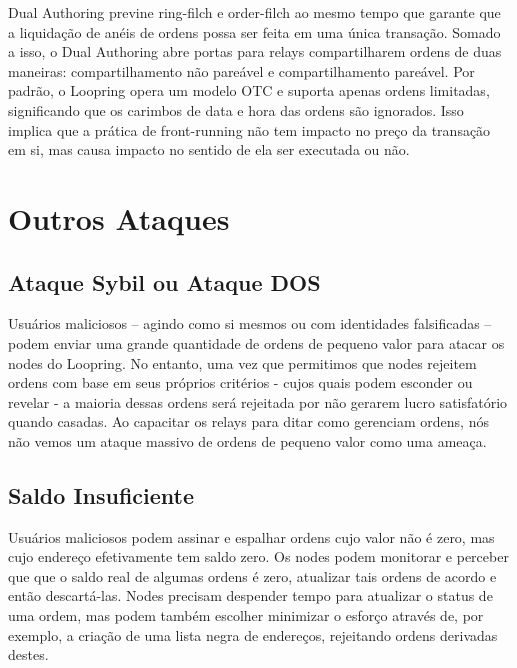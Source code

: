 \documentclass[UTF8,nofonts]{article}
\begin{document}
\begin{multicols}{2}
Dual Authoring previne ring-filch e order-filch ao mesmo tempo que garante que a liquidação de anéis de ordens possa ser feita em uma única transação. Somado a isso, o Dual Authoring abre portas para relays compartilharem ordens de duas maneiras: compartilhamento não pareável e compartilhamento pareável. Por padrão, o Loopring opera um modelo OTC e suporta apenas ordens limitadas, significando que os carimbos de data e hora das ordens são ignorados. Isso implica que a prática de front-running não tem impacto no preço da transação em si, mas causa impacto no sentido de ela ser executada ou não.

\section{Outros Ataques}

\subsection{Ataque Sybil ou Ataque DOS}
Usuários maliciosos – agindo como si mesmos ou com identidades falsificadas – podem enviar uma grande quantidade de ordens de pequeno valor para atacar os nodes do Loopring. No entanto, uma vez que permitimos que nodes rejeitem ordens com base em seus próprios critérios - cujos quais podem esconder ou revelar - a maioria dessas ordens será rejeitada por não gerarem lucro satisfatório quando casadas. Ao capacitar os relays para ditar como gerenciam ordens, nós não vemos um ataque massivo de ordens de pequeno valor como uma ameaça.

\subsection{Saldo Insuficiente}
Usuários maliciosos podem assinar e espalhar ordens cujo valor não é zero, mas cujo endereço efetivamente tem saldo zero. Os nodes podem monitorar e perceber que que o saldo real de algumas ordens é zero, atualizar tais ordens de acordo e então descartá-las. Nodes precisam despender tempo para atualizar o status de uma ordem, mas podem também escolher minimizar o esforço através de, por exemplo, a criação de uma lista negra de endereços, rejeitando ordens derivadas destes.


\end{multicols}
\end{document}
